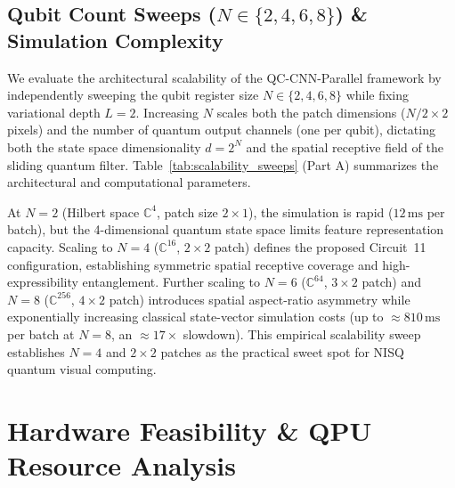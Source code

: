 \documentclass[journal]{IEEEtran}
\begin{document}
\subsection{Qubit Count Sweeps ($N \in \{2, 4, 6, 8\}$) \& Simulation Complexity}
We evaluate the architectural scalability of the QC-CNN-Parallel framework by independently sweeping the qubit register size $N \in \{2, 4, 6, 8\}$ while fixing variational depth $L = 2$. Increasing $N$ scales both the patch dimensions ($N/2 \times 2$ pixels) and the number of quantum output channels (one per qubit), dictating both the state space dimensionality $d = 2^N$ and the spatial receptive field of the sliding quantum filter. Table~\ref{tab:scalability_sweeps} (Part A) summarizes the architectural and computational parameters.

At $N = 2$ (Hilbert space $\mathbb{C}^4$, patch size $2 \times 1$), the simulation is rapid ($12\,\mathrm{ms}$ per batch), but the 4-dimensional quantum state space limits feature representation capacity. Scaling to $N = 4$ ($\mathbb{C}^{16}$, $2 \times 2$ patch) defines the proposed Circuit~11 configuration, establishing symmetric spatial receptive coverage and high-expressibility entanglement. Further scaling to $N = 6$ ($\mathbb{C}^{64}$, $3 \times 2$ patch) and $N = 8$ ($\mathbb{C}^{256}$, $4 \times 2$ patch) introduces spatial aspect-ratio asymmetry while exponentially increasing classical state-vector simulation costs (up to $\approx 810\,\mathrm{ms}$ per batch at $N=8$, an $\approx 17\times$ slowdown). This empirical scalability sweep establishes $N = 4$ and $2 \times 2$ patches as the practical sweet spot for NISQ quantum visual computing.

\section{Hardware Feasibility \& QPU Resource Analysis}
\label{sec:hardware}
\end{document}
